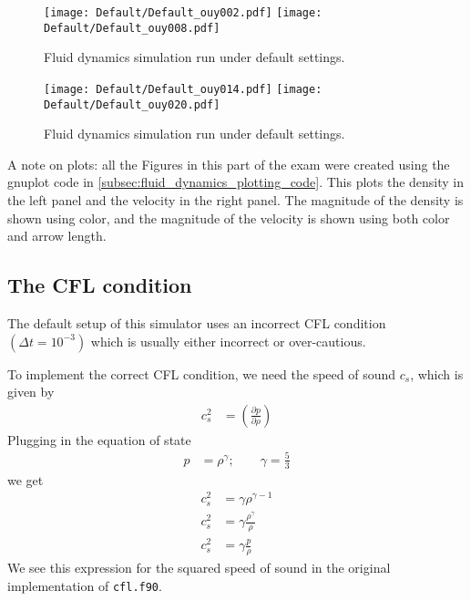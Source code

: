 \documentclass[twocolumn]{myarticle}
\numberwithin{equation}{section}
\begin{document}
\begin{figure*}[ht]
    \centering
    \texttt{[image: Default/Default\_ouy002.pdf]}
    \texttt{[image: Default/Default\_ouy008.pdf]}
    \caption{Fluid dynamics simulation run under default settings.}
    \label{fig:default1}
\end{figure*}

\begin{figure*}[ht]
    \centering
    \texttt{[image: Default/Default\_ouy014.pdf]}
    \texttt{[image: Default/Default\_ouy020.pdf]}
    \caption{Fluid dynamics simulation run under default settings.}
    \label{fig:default2}
\end{figure*}

A note on plots: all the Figures in this part of the exam were created using the gnuplot code in \ref{subsec:fluid_dynamics_plotting_code}.
This plots the density in the left panel and the velocity in the right panel.
The magnitude of the density is shown using color, and the magnitude of the velocity is shown using both color and arrow length.

\subsection{The CFL condition}
\label{subsec:the_cfl_condition}

The default setup of this simulator uses an incorrect CFL condition $ \left( \Delta t = 10^{-3} \right) $ which is usually either incorrect or over-cautious.

To implement the correct CFL condition, we need the speed of sound $ c_s $, which is given by
\begin{align}
    c_s^2 &= \left( \frac{\partial p}{\partial \rho} \right)
\end{align}
Plugging in the equation of state
\begin{align}
    p &= \rho^\gamma; \qquad \gamma = \frac{5}{3}
\end{align}
we get
\begin{align}
    c_s^2 &= \gamma \rho^{\gamma-1}
    \\
    c_s^2 &= \gamma \frac{\rho^{\gamma}}{\rho}
    \\
    c_s^2 &= \gamma \frac{p}{\rho}
\end{align}
We see this expression for the squared speed of sound in the original implementation of \texttt{cfl.f90}.
\end{document}

